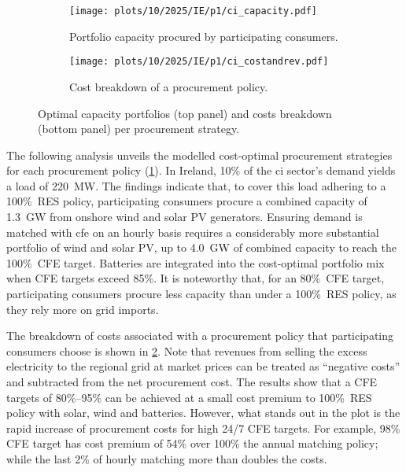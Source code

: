 \begin{figure}[t]
    \centering
    \begin{subfigure}[t]{0.95\columnwidth}
        \centering
        \caption{Portfolio capacity procured by participating consumers.}
        \texttt{[image: plots/10/2025/IE/p1/ci\_capacity.pdf]}
        \label{fig:10-2025-IE-p1-ci_capacity}
    \end{subfigure}
    \begin{subfigure}[t]{0.95\columnwidth}
        \centering
        \vspace{-0.2cm}
        \caption{Cost breakdown of a procurement policy.}
        \texttt{[image: plots/10/2025/IE/p1/ci\_costandrev.pdf]}
        \label{fig:10-2025-IE-p1-ci_costandrev}
    \end{subfigure}
    \caption{Optimal capacity portfolios (top panel) and costs breakdown (bottom panel) per procurement strategy.}
    \label{fig:10-2025-IE-p1-ci_procurement}
\end{figure}

The following analysis unveils the modelled cost-optimal procurement strategies for each procurement policy (\cref{fig:10-2025-IE-p1-ci_capacity}).
In Ireland, 10\% of the \gls{ci} sector's demand yields a load of 220~MW.
The findings indicate that, to cover this load adhering to a 100\%~RES policy, participating consumers procure a combined capacity of 1.3~GW from onshore wind and solar PV generators.
Ensuring demand is matched with \gls{cfe} on an hourly basis requires a considerably more substantial portfolio of wind and solar PV, up to 4.0~GW of combined capacity to reach the 100\%~CFE target.
Batteries are integrated into the cost-optimal portfolio mix when CFE targets exceed 85\%.
It is noteworthy that, for an 80\%~CFE target, participating consumers procure less capacity than under a 100\%~RES policy, as they rely more on grid imports.

The breakdown of costs associated with a procurement policy that participating consumers choose is shown in \cref{fig:10-2025-IE-p1-ci_costandrev}.
Note that revenues from selling the excess electricity to the regional grid at market prices can be treated as \enquote{negative costs} and subtracted from the net procurement cost.
The results show that a CFE targets of 80\%--95\% can be achieved at a small cost premium to 100\%~RES policy with solar, wind and batteries.
However, what stands out in the plot is the rapid increase of procurement costs for high 24/7 CFE targets. 
For example, 98\% CFE target has cost premium of 54\% over 100\% the annual matching policy; while the last 2\% of hourly matching more than doubles the costs.


